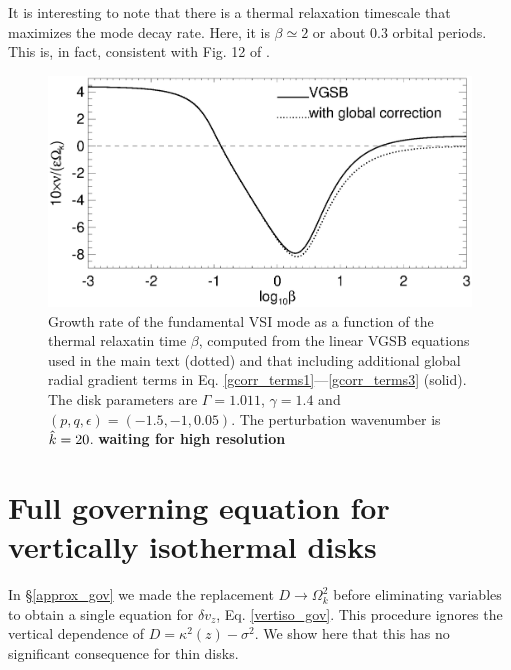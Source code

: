It is interesting to note that there is a thermal relaxation timescale
that maximizes the mode decay rate. Here, it is $\beta\simeq2$ or
about $0.3$ orbital periods. This is, in fact, consistent with Fig. 12
of \cite{nelson13}. 

\begin{figure}
  \includegraphics[width=\linewidth,clip=true,trim=0cm 0.0cm 0cm
  0cm]{figures/gcorr_compare} 
  \caption{Growth rate of
    the fundamental VSI mode as a function of the thermal
    relaxatin time $\beta$, computed from the linear VGSB equations used in
    the main text (dotted) and that including additional global
    radial gradient terms in  Eq. \ref{gcorr_terms1}---\ref{gcorr_terms3} (solid). 
    The disk parameters are $\Gamma=1.011$,
    $\gamma=1.4$ and $(p,q,\epsilon)=(-1.5,-1,0.05)$. The perturbation
    wavenumber is $\hat{k}=20$. 
    {\bf waiting for
      high resolution} 
    \label{gcorr_compare}}  
\end{figure}







\section{Full governing equation for vertically isothermal disks}\label{adia_improve}
In \S\ref{approx_gov} we made the replacement $D\to\Omega_k^2$ before
eliminating variables to obtain a single equation for $\delta v_z$,
Eq. \ref{vertiso_gov}.  This procedure ignores the vertical dependence of
$D=\kappa^2(z) - \sigma^2$. We show here that this has no significant
consequence for thin disks. 


